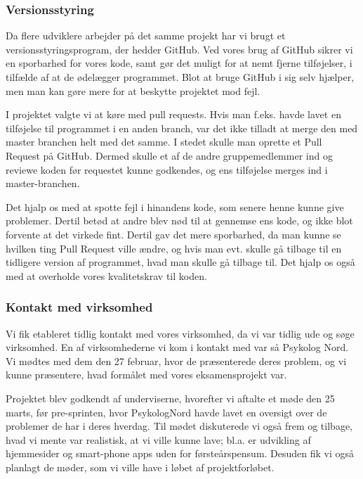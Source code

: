 \subsubsection{Versionsstyring}
\label{versionsstyring}

Da flere udviklere arbejder på det samme projekt har vi brugt et versionsstyringsprogram, der hedder GitHub.
Ved vores brug af GitHub sikrer vi en sporbarhed for vores kode, samt gør det muligt for at nemt fjerne tilføjelser, i tilfælde af at de ødelægger programmet.
Blot at bruge GitHub i sig selv hjælper, men man kan gøre mere for at beskytte projektet mod fejl.

I projektet valgte vi at køre med pull requests. 
Hvis man f.eks. havde lavet en tilføjelse til programmet i en anden branch, var det ikke tilladt at merge den med master branchen helt med det samme. 
I stedet skulle man oprette et Pull Request på GitHub. 
Dermed skulle et af de andre gruppemedlemmer ind og reviewe koden før requestet kunne godkendes, og ens tilføjelse merges ind i master-branchen.

Det hjalp os med at spotte fejl i hinandens kode, som senere henne kunne give problemer.
Dertil betød at andre blev nød til at gennemse ens kode, og ikke blot forvente at det virkede fint.
Dertil gav det mere sporbarhed, da man kunne se hvilken ting Pull Request ville ændre, og hvis man evt. skulle gå tilbage til en tidligere version af programmet, hvad man skulle gå tilbage til.
Det hjalp os også med at overholde vores kvalitetskrav til koden. 

\subsubsection{Kontakt med virksomhed}

Vi fik etableret tidlig kontakt med vores virksomhed, da vi var tidlig ude og søge virksomhed.
En af virksomhederne vi kom i kontakt med var så Psykolog Nord.
Vi mødtes med dem den 27 februar, hvor de præsenterede deres problem, og vi kunne præsentere, hvad formålet med vores eksamensprojekt var.

Projektet blev godkendt af underviserne, hvorefter vi aftalte et møde den 25 marts, før pre-sprinten, hvor PsykologNord havde lavet en oversigt over de problemer de har i deres hverdag.
Til mødet diskuterede vi også frem og tilbage, hvad vi mente var realistisk, at vi ville kunne lave; bl.a. er udvikling af hjemmesider og smart-phone apps uden for førsteårspensum.
Desuden fik vi også planlagt de møder, som vi ville have i løbet af projektforløbet.

